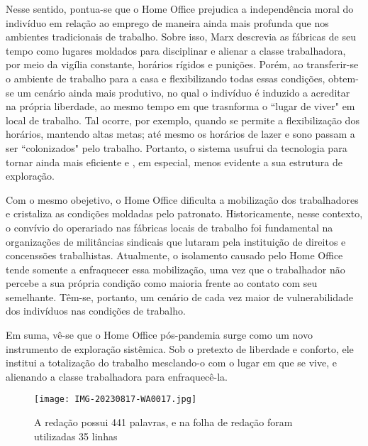 \documentclass{article}
\begin{document}
Nesse sentido, pontua-se que o Home Office prejudica a independência moral do indivíduo em relação ao emprego de maneira ainda mais profunda que nos ambientes tradicionais de trabalho. Sobre isso, Marx descrevia as fábricas de seu tempo como lugares moldados para disciplinar e alienar a classe trabalhadora, por meio da vigília constante, horários rígidos e punições. Porém, ao transferir-se o ambiente de trabalho para a casa e flexibilizando todas essas condições, obtem-se um cenário ainda mais produtivo, no qual o indivíduo é induzido a acreditar na própria liberdade, ao mesmo tempo em que trasnforma o “lugar de viver" em local de trabalho. Tal ocorre, por exemplo,  quando se permite a flexibilização dos horários, mantendo altas metas; até mesmo os horários de lazer e sono passam a ser “colonizados" pelo trabalho. Portanto, o sistema usufrui da tecnologia para tornar ainda mais eficiente e , em especial, menos evidente a sua estrutura de exploração.

Com o mesmo obejetivo, o Home Office dificulta a mobilização dos trabalhadores e cristaliza as condições moldadas pelo patronato. Historicamente, nesse contexto, o convívio do operariado nas fábricas locais de trabalho foi fundamental na organizações de militâncias sindicais que lutaram pela instituição de direitos e concenssões trabalhistas. Atualmente, o isolamento causado pelo Home Office tende somente a enfraquecer essa mobilização, uma vez que o trabalhador não percebe a sua própria condição como maioria frente ao contato com seu semelhante. Têm-se, portanto, um cenário de cada vez maior de vulnerabilidade dos indivíduos nas condições de trabalho.


Em suma, vê-se que o Home Office pós-pandemia surge como um novo instrumento de exploração sistêmica. Sob o pretexto de liberdade e conforto, ele institui a totalização do trabalho mesclando-o com o lugar em que se vive, e alienando a classe trabalhadora para enfraquecê-la.


\newpage
\begin{figure}
\centering
\texttt{[image: IMG-20230817-WA0017.jpg]}
\caption{\label{}A redação possui 441 palavras, e na folha de redação foram utilizadas 35 linhas}
\end{figure}
\end{document}
